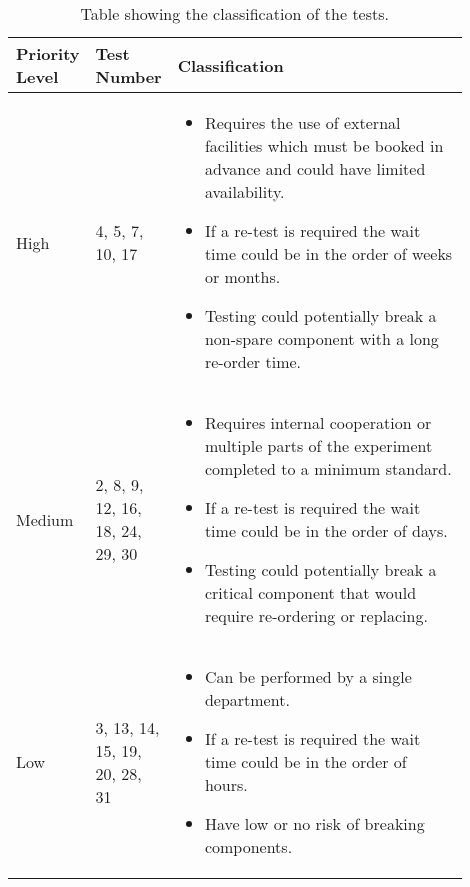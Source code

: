\begin{table}[H]
\centering
\begin{tabular}{|p{0.1\linewidth}|p{0.1\linewidth}|p{0.7\linewidth}|}
\hline
Priority Level & Test Number & Classification \\ \hline
High & 4, 5, 7, 10, 17 & \begin{itemize}
    \item Requires the use of external facilities which must be booked in advance and could have limited availability.
    \item If a re-test is required the wait time could be in the order of weeks or months.
    \item Testing could potentially break a non-spare component with a long re-order time.
\end{itemize}\\ \hline
Medium & 2, 8, 9, 12, 16, 18, 24, 29, 30 & \begin{itemize}
    \item Requires internal cooperation or multiple parts of the experiment completed to a minimum standard.
    \item If a re-test is required the wait time could be in the order of days.
    \item Testing could potentially break a critical component that would require re-ordering or replacing.
\end{itemize} \\ \hline
Low & 3, 13, 14, 15, 19, 20, 28, 31 & \begin{itemize}
    \item Can be performed by a single department.
    \item If a re-test is required the wait time could be in the order of hours.
    \item Have low or no risk of breaking components.
\end{itemize} \\ \hline
\end{tabular}
\caption{Table showing the classification of the tests.}
\label{tab:classification}
\end{table}

\raggedbottom